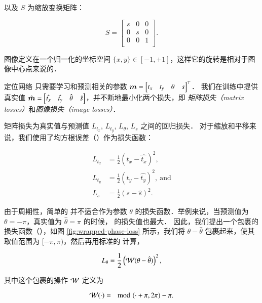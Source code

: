 \noindent 以及 $S$ 为缩放变换矩阵：

$$
S =
\begin{bmatrix}
s & 0 & 0 \\
0 & s & 0 \\
0 & 0 & 1 \\
\end{bmatrix}.
$$

\noindent 图像定义在一个归一化的坐标空间 $\{x, y\} \in [-1, +1]$，这样它的旋转是相对于图像中心点来说的．

定位网络 \LocNet{} 只需要学习和预测相关的参数 $\bm{m} = \begin{bmatrix}t_x & t_y & \theta & s \end{bmatrix}^\top$．
我们在训练中提供真实值 $\hat{\bm{m}} = \begin{bmatrix} \hat{t_x} & \hat{t_y} & \hat{\theta} & \hat{s} \end{bmatrix}$，并不断地最小化两个损失，即 \emph{矩阵损失（matrix losses）}和\emph{图像损失（image losses）}．

矩阵损失为真实值与预测值 $L_{t_x}$, $L_{t_y}$, $L_\theta$, $L_s$ 之间的回归损失．
对于缩放和平移来说，我们使用了均方根误差（\MSE{}）作为损失函数：

\begin{align}
L_{t_x} & = \frac{1}{2} (t_x - \hat{t_x})^2, \label{eqn:attn-mat-loss-tx} \\
L_{t_y} & = \frac{1}{2} (t_y - \hat{t_y})^2, \mathrm{~and} \label{eqn:attn-mat-loss-ty} \\
L_s     & = \frac{1}{2} (s - \hat{s})^2. \label{eqn:attn-mat-loss-s}
\end{align}



由于周期性，简单的 \MSE{} 并不适合作为参数 $\theta$ 的损失函数．举例来说，当预测值为 $\theta = -\pi$，真实值为 $\hat{\theta} = \pi$ 的时候，\MSE{} 的损失值也最大．
因此，我们提出一个包裹的 \MSE{} 损失函数（\MSWE{}），如图 \ref{fig:wrapped-phase-loss} 所示，我们将 $\theta - \hat{\theta}$ 包裹起来，使其取值范围为 $[-\pi, \pi)$，然后再用标准的 \MSE{} 计算，

\begin{equation}
L_\theta = \frac{1}{2} \left(\mathcal{W}(\theta - \hat{\theta})\right)^2, \label{eqn:attn-mat-loss-r}
\end{equation}

\noindent 其中这个包裹的操作 $\mathcal{W}$ 定义为

$$
\mathcal{W}(\cdot) = \mod(\cdot + \pi, 2\pi) - \pi.
$$

